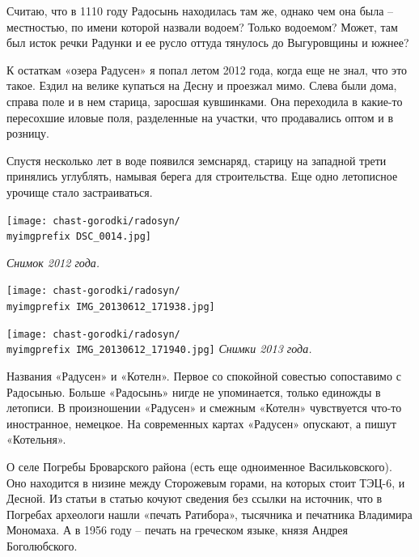 Считаю, что в 1110 году Радосынь находилась там же, однако чем она была – местностью, по имени которой назвали водоем? Только водоемом? Может, там был исток речки Радунки и ее русло оттуда тянулось до Выгуровщины и южнее?

К остаткам «озера Радусен» я попал летом 2012 года, когда еще не знал, что это такое. Ездил на велике купаться на Десну и проезжал мимо. Слева были дома, справа поле и в нем старица, заросшая кувшинками. Она переходила в какие-то пересохшие иловые поля, разделенные на участки, что продавались оптом и в розницу.

Спустя несколько лет в воде появился земснаряд, старицу на западной трети принялись углублять, намывая берега для строительства. Еще одно летописное урочище стало застраиваться.
\vspace*{\fill}
\begin{center}
\texttt{[image: chast-gorodki/radosyn/\\myimgprefix DSC\_0014.jpg]}

\textit{Снимок 2012 года.}
\end{center}
\vspace*{\fill}

\newpage
\vspace*{\fill}
\begin{center}
\texttt{[image: chast-gorodki/radosyn/\\myimgprefix IMG\_20130612\_171938.jpg]}
\end{center}

\begin{center}
\texttt{[image: chast-gorodki/radosyn/\\myimgprefix IMG\_20130612\_171940.jpg]}
\textit{Снимки 2013 года.}
\end{center}
\vspace*{\fill}
\newpage


Названия «Радусен» и «Котелн». Первое со спокойной совестью сопоставимо с Радосынью. Больше «Радосынь» нигде не упоминается, только единожды в летописи. В произношении «Радусен» и смежным «Котелн» чувствуется что-то иностранное, немецкое. На современных картах «Радусен» опускают, а пишут «Котельня».

О селе Погребы Броварского района (есть еще одноименное Васильковского). Оно находится в низине между Сторожевым горами, на которых стоит ТЭЦ-6, и Десной. Из статьи в статью кочуют сведения без ссылки на источник, что в Погребах археологи нашли «печать Ратибора», тысячника и печатника Владимира Мономаха. А в 1956 году – печать на греческом языке, князя Андрея Боголюбского.

